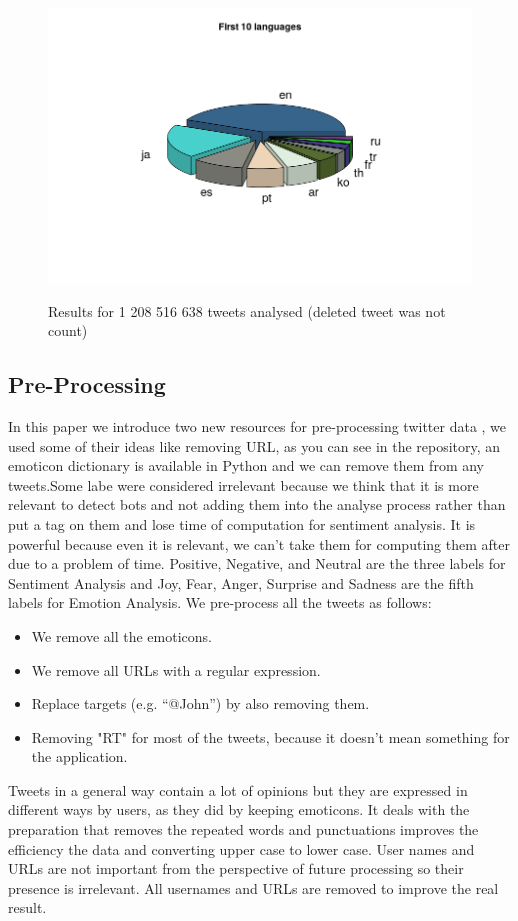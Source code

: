 \documentclass{acmtog} %
\begin{document}
\begin{figure}[H]
{\includegraphics[width=\linewidth]{first_ten_languages.png}}
\caption{Results for 1 208 516 638 tweets analysed (deleted tweet was not count)}
  \label{fig:trump_results}
\end{figure}


\subsection{Pre-Processing}
\label{subsub:preprocessing}

In this paper we introduce two new resources for pre-processing twitter data \cite{Jianqiang17}, we used some of their ideas like removing URL, as you can see in the repository, an emoticon dictionary is available in Python and we can remove them from any tweets.Some labe were considered irrelevant \cite{Poddar16} because we think that it is more relevant to detect bots and not adding them into the analyse process rather than put a tag on them and lose time of computation for sentiment analysis. It is powerful because even it is relevant, we can’t take them for computing them after due to a problem of time. Positive, Negative, and Neutral are the three labels for Sentiment Analysis and Joy, Fear, Anger, Surprise and Sadness are the fifth labels for Emotion Analysis. We pre-process all the tweets as follows:
\begin{itemize}
\item  We remove all the emoticons.
\item  We remove all URLs with a regular expression. 
\item  Replace targets (e.g. “@John”) by also removing them.
\item  Removing "RT" for most of the tweets, because it doesn't mean something for the application. 
\end{itemize}
Tweets in a general way contain a lot of opinions but they are expressed in different ways by users, as they did \cite{Rebecca11} by keeping emoticons. It deals with the preparation that removes the repeated words and punctuations improves the efficiency the data and converting upper case to lower case. User names and URLs are not important from the perspective of future processing so their presence is irrelevant. All usernames and URLs are removed to improve the real result. 
\end{document}
